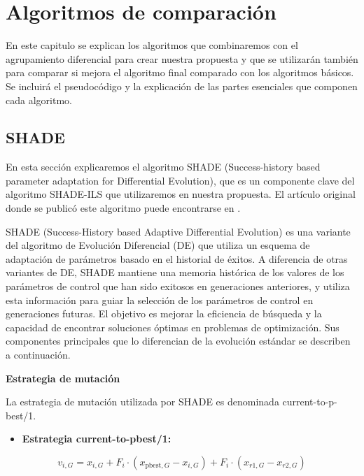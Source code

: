 
\chapter{Algoritmos de comparación}

En este capitulo se explican los algoritmos que combinaremos con el agrupamiento diferencial  para crear nuestra propuesta y que se utilizarán también para comparar si mejora el algoritmo final comparado con los algoritmos básicos. Se incluirá el pseudocódigo y la explicación de las partes esenciales que componen cada algoritmo.

\section{SHADE}

En esta sección explicaremos el algoritmo SHADE (Success-history based parameter adaptation for Differential Evolution), que es un componente clave del algoritmo SHADE-ILS que utilizaremos en nuestra propuesta. El artículo original donde se publicó este algoritmo puede encontrarse en \cite{TanabeShade}.

\textbf{\vspace{10px}}

\noindent SHADE (Success-History based Adaptive Differential Evolution) es una variante del algoritmo de Evolución Diferencial (DE) que utiliza un esquema de adaptación de parámetros basado en el historial de éxitos. A diferencia de otras variantes de DE, SHADE mantiene una memoria histórica de los valores de los parámetros de control que han sido exitosos en generaciones anteriores, y utiliza esta información para guiar la selección de los parámetros de control en generaciones futuras. El objetivo es mejorar la eficiencia de búsqueda y la capacidad de encontrar soluciones óptimas en problemas de optimización. Sus componentes principales que lo diferencian de la evolución estándar se describen a continuación.

\vspace{10px}

\noindent\textbf{Estrategia de mutación}
\newline

\noindent La estrategia de mutación utilizada por SHADE es denominada current-to-p-best/1.

\begin{itemize}
\item \textbf{Estrategia current-to-pbest/1:}
\end{itemize}
\begin{equation}
v_{i,G} = x_{i,G} + F_i \cdot (x_{\text{pbest},G} - x_{i,G}) + F_i \cdot (x_{r1,G} - x_{r2,G})
\label{eq:mutation_strategy}
\end{equation}

